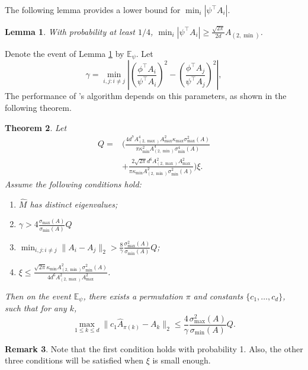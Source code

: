 \documentclass[twoside]{article}
\newcommand{\Epsi}{\mathbb{E}_{\psi}}
\newtheorem{lemma}{Lemma}[section]
\newtheorem{thm}[lemma]{Theorem}
\theoremstyle{definition}
\newtheorem{remark}[lemma]{Remark}
\begin{document}
The following lemma provides a lower bound for $\min_i |\psi^{\top}A_i|$.
\begin{lemma}
\label{lem:dmin}
With probability at least $1/4$, $\min_i |\psi^{\top}A_i| \ge \frac{\sqrt{2\pi}}{2d}A_{(2,\min)}$.  
\end{lemma}
Denote the event of Lemma \ref{lem:dmin} by $\Epsi$. Let 
\begin{equation}
\label{def:kappa}
\gamma =  \min_{i,j: i\neq j} \left\vert \left(\frac{\phi^{\top}A_i}{\psi^{\top}A_i}\right)^2 - \left(\frac{\phi^{\top}A_j}{\psi^{\top}A_j}\right)^2 \right\vert, 
\end{equation}
The performance of \citet{DHsu2012}'s algorithm depends on this parameters, as shown in the following theorem.
\begin{thm}
 \label{thm:efficiency}
Let 
 \begin{align*}
 Q = &\Big(\frac{4d^7A_{(2,\max)}^4A_{\max}^2\kappa_{\max}\sigma_{\max}^2(A) }{\pi\kappa^2_{\min}A^4_{(2,\min)}\sigma_{\min}^4(A)} \\
 & + \frac{2\sqrt{2\pi}d^6A_{(2,\max)}^2A_{\max}^2}{\pi\kappa_{\min}A^2_{(2,\min)}\sigma_{\min}^2(A)} \Big)
  \xi.
 \end{align*}
 Assume the following conditions hold:
 \begin{enumerate}
 \vspace{-3mm}
 \item $\widehat{M}$ has distinct eigenvalues;
 \item $\gamma > 4\frac{\sigma_{\max}(A)}{\sigma_{\min}(A)} Q$
 \item $\min_{i,j:i\neq j} \|A_i - A_j\|_2 > \frac{8}{\gamma}\frac{\sigma_{\max}^2(A)}{\sigma_{\min}(A) } Q$;
 \item $\xi \le \frac{\sqrt{2\pi}\kappa_{\min}A^2_{(2,\min)}\sigma_{\min}^2(A)}{4d^6 A_{(2,\max)}^2A_{\max}^2}$.
  \end{enumerate}
 Then on the event $\Epsi$, there exists a permutation $\pi$ and constants $\{c_1,\ldots,c_d\}$, such that for any $k$,
 \[
  \max_{1\le k\le d}\| c_1\widehat{A}_{\pi(k)} - A_k\|_2 \le \frac{4}{\gamma} \frac{\sigma_{\max}^2(A)}{ \sigma_{\min}(A)}Q.
  \]
 \end{thm}
\begin{remark}
Note that the first condition holds with probability 1. Also, the other three conditions will be satisfied when $\xi$ is small enough. 
\end{remark}
\end{document}
